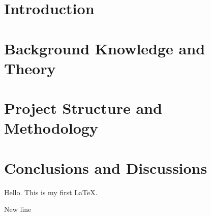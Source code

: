 \documentclass[semifinal]{cpecmu}
\author{นายเนวิน ยามากุชิ}{Newin Yamaguchi}{630615028}
\author{นางสาวพัชราภรณ์ สท้านไตรภพ}{Patcharaporn Satantaipop}{630615035}
\begin{document}
    

    \pagestyle{empty}\cleardoublepage
    \normalspacing \setcounter{page}{1}  \pagestyle{cpecmu}

    
    
    
    

    \section{Introduction}\label{sec:introduction}
    \section{Background Knowledge and Theory}\label{sec:background}
    \section{Project Structure and Methodology}\label{sec:structure}
    \section{Conclusions and Discussions}\label{sec:conclusions}

    Hello.
    This is my first LaTeX\@.

    New line~\cite{Newin}

    
    
\end{document}
